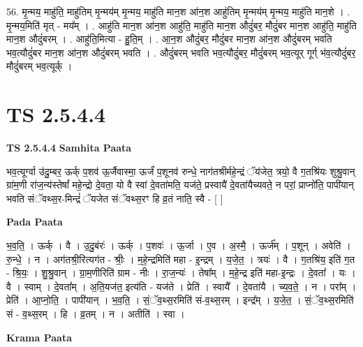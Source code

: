\documentclass[17pt]{extarticle}
\begin{document}
56. मृ॒न्मय॒ माहु॑ति॒ माहु॑तिम् मृ॒न्मय॑म् मृ॒न्मय॒ माहु॑ति मान॒श आ॑न॒श आहु॑तिम् मृ॒न्मय॑म् मृ॒न्मय॒ माहु॑ति मान॒शे । . मृ॒न्मय॒मिति॑ मृत् - मय᳚म् । . आहु॑ति मान॒श आ॑न॒श आहु॑ति॒ माहु॑ति मान॒श औदुं॑बर॒ मौदुं॑बर मान॒श आहु॑ति॒ माहु॑ति मान॒श औदुं॑बरम् । . आहु॑ति॒मित्या - हु॒ति॒म् । . आ॒न॒श औदुं॑बर॒ मौदुं॑बर मान॒श आ॑न॒श औदुं॑बरम् भवति भव॒त्यौदुं॑बर मान॒श आ॑न॒श औदुं॑बरम् भवति । . औदुं॑बरम् भवति भव॒त्यौदुं॑बर॒ मौदुं॑बरम् भव॒त्यूर् गूर्ग् भ॑व॒त्यौदुं॑बर॒ मौदुं॑बरम् भव॒त्यूर्क् । \newline
\pagebreak
{}
\section*{ TS 2.5.4.4 }

\textbf{TS 2.5.4.4 } \newline
\textbf{Samhita Paata} \newline

भव॒त्यूर्ग्वा उ॑दु॒म्बर॒ ऊर्क् प॒शव॑ ऊ॒र्जैवास्मा॒ ऊर्जं॑ प॒शूनव॑ रुन्धे॒ नाग॑तश्रीर्महे॒न्द्रं ॅय॑जेत॒ त्रयो॒ वै ग॒तश्रि॑यः शुश्रु॒वान् ग्रा॑म॒णी रा॑ज॒न्य॑स्तेषां᳚ महे॒न्द्रो दे॒वता॒ यो वै स्वां दे॒वता॑मति॒ यज॑ते॒ प्रस्वायै॑ दे॒वता॑यैच्यवते॒ न परां॒ प्राप्नो॑ति॒ पापी॑यान् भवति संॅवथ्स॒र-मिन्द्रं॑ ॅयजेत संॅवथ्स॒रꣳ हि व्र॒तं नाति॒ स्वै - [  ] \newline

\textbf{Pada Paata} \newline

भ॒व॒ति॒ । ऊर्क् । वै । उ॒दु॒बंरः॑ । ऊर्क् । प॒शवः॑ । ऊ॒र्जा । ए॒व । अ॒स्मै॒ । ऊर्ज᳚म् । प॒शून् । अवेति॑ । रु॒न्धे॒ । न । अग॑तश्री॒रित्यग॑त - श्रीः॒ । म॒हे॒न्द्रमिति॑ महा - इ॒न्द्रम् । य॒जे॒त॒ । त्रयः॑ । वै । ग॒तश्रि॑य॒ इति॑ ग॒त - श्रि॒यः॒ । शु॒श्रु॒वान् । ग्रा॒म॒णीरिति॑ ग्राम - नीः । रा॒ज॒न्यः॑ । तेषा᳚म् । म॒हे॒न्द्र इति॑ महा-इ॒न्द्रः । दे॒वता᳚ । यः । वै । स्वाम् । दे॒वता᳚म् । अ॒ति॒यज॑त॒ इत्य॑ति - यज॑ते । प्रेति॑ । स्वायै᳚ । दे॒वता॑यै । च्य॒व॒ते॒ । न । परा᳚म् । प्रेति॑ । आ॒प्नो॒ति॒ । पापी॑यान् । भ॒व॒ति॒ । सं॒ॅव॒थ्स॒रमिति॑ सं-व॒थ्स॒रम् । इन्द्र᳚म् । य॒जे॒त॒ । सं॒ॅव॒थ्स॒रमिति॑ सं - व॒थ्स॒रम् । हि । व्र॒तम् । न । अतीति॑ । स्वा ।  \newline


\textbf{Krama Paata} \newline
\end{document}
